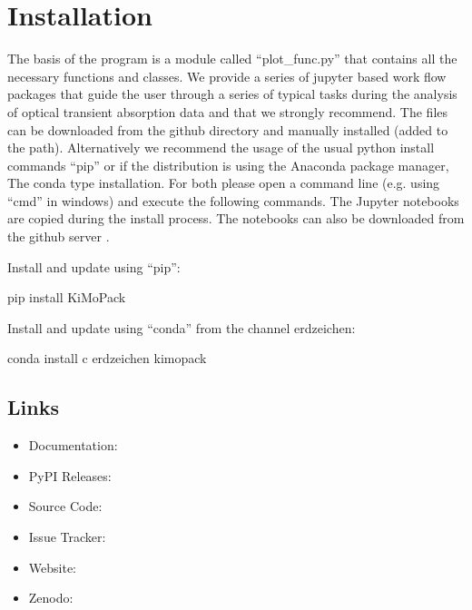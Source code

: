 \documentclass[letterpaper,10pt,english]{sphinxmanual}
\begin{document}
\chapter{Installation}
\label{\detokenize{Installation:installation}}\label{\detokenize{Installation::doc}}
The basis of the program is a module called “plot\_func.py” that contains all the necessary functions and classes.
We provide a series of jupyter based work flow packages that guide the user through a series of typical tasks
during the analysis of optical transient absorption data and that we strongly recommend.
The files can be downloaded from the github directory  and manually installed (added to the path).
Alternatively we recommend the usage of the usual python install commands “pip” or if the distribution is using the Anaconda
package manager, The conda type installation. For both please open a command line (e.g. using “cmd” in windows) and execute the following commands.
The Jupyter notebooks are copied during the install process. The notebooks can also be downloaded from the github server .

Install and update using “pip”:

\begin{sphinxVerbatim}[commandchars=\\\{\}]
\PYGZdl{} pip install KiMoPack
\end{sphinxVerbatim}

Install and update using “conda” from the channel erdzeichen:

\begin{sphinxVerbatim}[commandchars=\\\{\}]
\PYGZdl{} conda install \PYGZhy{}c erdzeichen kimopack
\end{sphinxVerbatim}


\section{Links}
\label{\detokenize{Installation:links}}\begin{itemize}
\item {} 
Documentation: 

\item {} 
PyPI Releases: 

\item {} 
Source Code: 

\item {} 
Issue Tracker: 

\item {} 
Website: 

\item {} 
Zenodo: 

\end{itemize}
\end{document}
